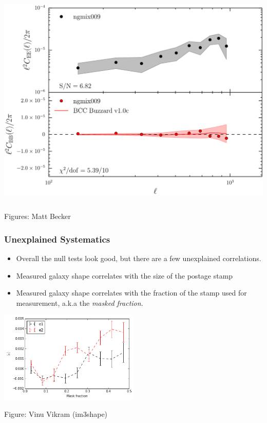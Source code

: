 \documentclass{beamer}
\begin{document}
{\begin{columns}
        \begin{column}{0.5\textwidth}
            \begin{center}
                \includegraphics[width=1.05\textwidth]{ngmix009_eb_crop.pdf}
            \end{center}
        \end{column}

    \end{columns}
    {\tiny Figures: Matt Becker}
}

\frame
{
    \frametitle{Unexplained Systematics}

    \begin{itemize}

        \item Overall the null tests look good, but there are a few unexplained
            correlations.

        \item Measured galaxy shape correlates with the size of the postage stamp
    
         \item Measured galaxy shape correlates with the fraction of the stamp
             used for measurement, a.k.a the {\em masked fraction}.

     \end{itemize}

    \begin{center}
        \includegraphics[width=0.5\textwidth]{im3shape-v-vs-mask-frac.png}
    \end{center}

     {\tiny Figure: Vinu Vikram (im3shape)}
}
\end{document}
